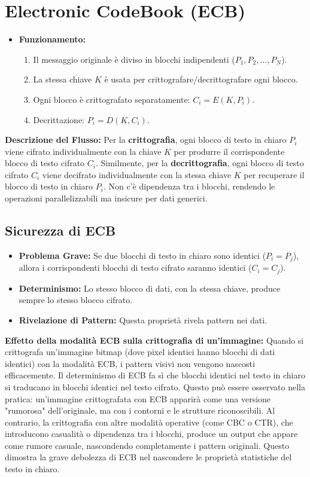 \section{Electronic CodeBook (ECB)}
\begin{itemize}
    \item \textbf{Funzionamento:}
    \begin{enumerate}
        \item Il messaggio originale è diviso in blocchi indipendenti ($P_1, P_2, \ldots, P_N$).
        \item La stessa chiave $K$ è usata per crittografare/decrittografare ogni blocco.
        \item Ogni blocco è crittografato separatamente: $C_i = E(K, P_i)$.
        \item Decrittazione: $P_i = D(K, C_i)$.
    \end{enumerate}
\end{itemize}
\textbf{Descrizione del Flusso:}
Per la \textbf{crittografia}, ogni blocco di testo in chiaro $P_i$ viene cifrato individualmente con la chiave $K$ per produrre il corrispondente blocco di testo cifrato $C_i$. Similmente, per la \textbf{decrittografia}, ogni blocco di testo cifrato $C_i$ viene decifrato individualmente con la stessa chiave $K$ per recuperare il blocco di testo in chiaro $P_i$. Non c'è dipendenza tra i blocchi, rendendo le operazioni parallelizzabili ma insicure per dati generici.

\subsection{Sicurezza di ECB}
\begin{itemize}
    \item \textbf{Problema Grave:} Se due blocchi di testo in chiaro sono identici ($P_i = P_j$), allora i corrispondenti blocchi di testo cifrato saranno identici ($C_i = C_j$).
    \item \textbf{Determinismo:} Lo stesso blocco di dati, con la stessa chiave, produce sempre lo stesso blocco cifrato.
    \item \textbf{Rivelazione di Pattern:} Questa proprietà rivela pattern nei dati.
\end{itemize}
\textbf{Effetto della modalità ECB sulla crittografia di un'immagine:}
Quando si crittografa un'immagine bitmap (dove pixel identici hanno blocchi di dati identici) con la modalità ECB, i pattern visivi non vengono nascosti efficacemente. Il determinismo di ECB fa sì che blocchi identici nel testo in chiaro si traducano in blocchi identici nel testo cifrato. Questo può essere osservato nella pratica: un'immagine crittografata con ECB apparirà come una versione "rumorosa" dell'originale, ma con i contorni e le strutture riconoscibili. Al contrario, la crittografia con altre modalità operative (come CBC o CTR), che introducono casualità o dipendenza tra i blocchi, produce un output che appare come rumore casuale, nascondendo completamente i pattern originali. Questo dimostra la grave debolezza di ECB nel nascondere le proprietà statistiche del testo in chiaro.

